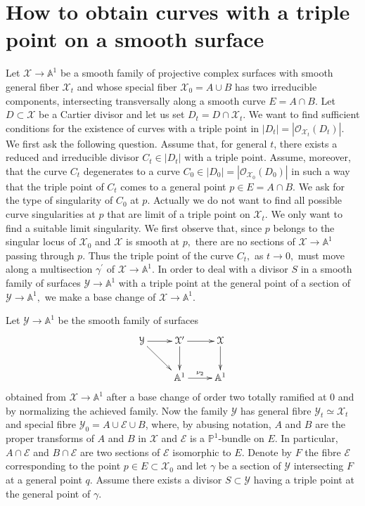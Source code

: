 \documentclass[plain]{amsart}
\begin{document}
\section{How to obtain curves with a triple point on a smooth surface}\label{sect: getting triple point}
Let $\mathcal X\to\mathbb A^1$ be a smooth family of projective complex surfaces with smooth general fiber
$\mathcal X_t$ and whose special fiber $\mathcal X_0=A\cup B$
has two irreducible components, intersecting transversally along a 
smooth curve $E=A\cap B.$ Let $D\subset\mathcal X$ be a Cartier divisor  and let us set
$D_t=D\cap\mathcal X_t.$ 
 We want to find sufficient conditions for the existence 
of curves with a triple point in $|D_t|=|\mathcal O_{\mathcal X_t}(D_t)|.$
We first ask the following question.
Assume that, for general $t$, there exists a reduced and irreducible divisor $C_t\in 
|D_t|$ with a triple point.
Assume, moreover, that the curve $C_t$ degenerates to 
a curve $C_0\in |D_0|=|\mathcal O_{\mathcal X_0}(D_0)|$ in such a way that the triple point of $C_t$
comes to a general point $p\in E=A\cap B.$ We ask for the type of singularity of $C_0$ at $p.$
Actually we do not want to find all possible curve singularities at $p$ that are limit of a triple
point on $\mathcal X_t.$ We only want to find a suitable limit singularity. We first observe that,
since $p$ belongs to the singular locus of $\mathcal X_0$ and $\mathcal X$ is smooth at $p,$
there are no sections of $\mathcal X\to\mathbb A^1$ passing through $p.$ Thus the triple point of 
the curve $C_t,$ as $t\to 0,$ must move along a multisection $\gamma^\prime$ of  $\mathcal X\to\mathbb A^1.$ 
In order to deal with a divisor $S$ in a smooth family of surfaces $\mathcal Y\to\mathbb A^1$
with a triple point at the general point of a section of $\mathcal Y\to\mathbb A^1,$ we make a base change of 
$\mathcal X\to\mathbb A^1.$\smallskip

Let $\mathcal Y\to\mathbb A^1$ be the smooth family of surfaces
\begin{displaymath}
\xymatrix{
\mathcal Y\ar[r]\ar[dr]&  \mathcal X^\prime \ar[d]\ar[r] &
\mathcal X\ar[d]\\
& \mathbb A^1\ar[r]^{\nu_2}&\mathbb A^1  }
\end{displaymath}
obtained from $\mathcal X\to\mathbb A^1$ after a base change of order two totally ramified at $0$
and by normalizing the achieved family.  
Now the family $\mathcal Y$ has general fibre $\mathcal Y_t\simeq\mathcal X_t$ and special 
fibre $\mathcal Y_0=A\cup \mathcal E\cup B$, where, by abusing notation, $A$ and $B$ are 
the proper transforms of $A$ and $B$ in $\mathcal X$ and $\mathcal E$ is a $\mathbb P^1$-bundle 
on $E.$ In particular, $A\cap\mathcal E$ and $B\cap\mathcal E$ are two sections of $\mathcal E$ 
isomorphic to $E.$ Denote by $F$ the fibre $\mathcal E$ corresponding to the point $p\in E\subset \mathcal X_0$ and
let $\gamma$ be a section of $\mathcal Y$ intersecting $F$ at a general point $q.$ 
Assume there exists a divisor $S\subset \mathcal Y$ having a triple point at the general 
point of $\gamma.$ 
\end{document}

